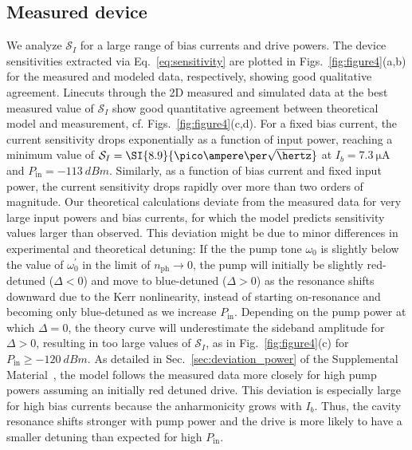 \subsection{Measured device}
% 
We analyze $\mathcal{S}_I$ for a large range of bias currents and drive powers.
% 
The device sensitivities extracted via Eq.~\eqref{eq:sensitivity} are plotted in Figs.~\ref{fig:figure4}(a,b) for the measured and modeled data, respectively, showing good qualitative agreement.
% 
Linecuts through the 2D measured and simulated data at the best measured value of $\mathcal{S}_I$ show good quantitative agreement between theoretical model and measurement, cf. Figs.~\ref{fig:figure4}(c,d).
% 
For a fixed bias current, the current sensitivity drops exponentially as a function of input power, reaching a minimum value of $\mathcal{S}_I=\SI{8.9}{\pico\ampere\per\sqrt{\hertz}}$ at $I_b=\SI{7.3}{\micro\ampere}$ and $P_\text{in}=\SI{-113}{dBm}$.
% 
Similarly, as a function of bias current and fixed input power, the current sensitivity drops rapidly over more than two orders of magnitude.
% 
Our theoretical calculations deviate from the measured data for very large input powers and bias currents, for which the model predicts sensitivity values larger than observed.
% 
This deviation might be due to minor differences in experimental and theoretical detuning:
% 
If the the pump tone $\omega_0$ is slightly below the value of $\omega_0^\prime$ in the limit of $n_\text{ph}\rightarrow0$, the pump will initially be slightly red-detuned ($\Delta<0$) and move to blue-detuned ($\Delta>0$) as the resonance shifts downward due to the Kerr nonlinearity, instead of starting on-resonance and becoming only blue-detuned as we increase $P_\text{in}$.
% 
Depending on the pump power at which $\Delta=0$, the theory curve will underestimate the sideband amplitude for $\Delta>0$, resulting in too large values of $\mathcal{S}_I$, as in Fig.~\ref{fig:figure4}(c) for $P_\text{in}\geq\SI{-120}{dBm}$.
% 
As detailed in Sec.~\ref{sec:deviation_power} of the Supplemental Material~\cite{SeeSupplementalMaterial}, the model follows the measured data more closely for high pump powers assuming an initially red detuned drive.
% 
This deviation is especially large for high bias currents because the anharmonicity grows with $I_b$.
% 
Thus, the cavity resonance shifts stronger with pump power and the drive is more likely to have a smaller detuning than expected for high $P_\text{in}$.


